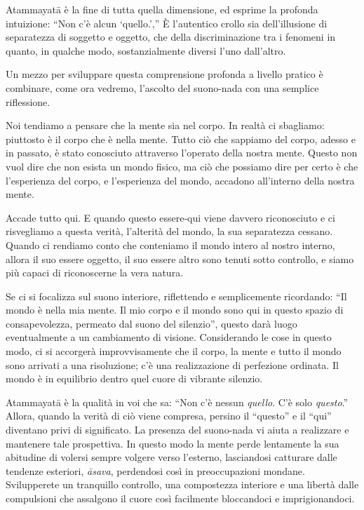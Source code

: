 Atammayatā è la fine di tutta quella dimensione, ed esprime la profonda
intuizione: ``Non c'è alcun `quello.'\thinspace ,'' È l'autentico crollo sia
dell'illusione di separatezza di soggetto e oggetto, che della
discriminazione tra i fenomeni in quanto, in qualche modo,
sostanzialmente diversi l'uno dall'altro.

Un mezzo per sviluppare questa comprensione profonda a livello pratico è
combinare, come ora vedremo, l'ascolto del suono-nada con una semplice
riflessione.

Noi tendiamo a pensare che la mente sia nel corpo. In realtà ci
sbagliamo: piuttosto è il corpo che è nella mente. Tutto ciò che
sappiamo del corpo, adesso e in passato, è stato conosciuto attraverso
l'operato della nostra mente. Questo non vuol dire che non esista un
mondo fisico, ma ciò che possiamo dire per certo è che l'esperienza del
corpo, e l'esperienza del mondo, accadono all'interno della nostra
mente.

Accade tutto qui. E quando questo essere-qui viene davvero riconosciuto
e ci risvegliamo a questa verità, l'alterità del mondo, la sua
separatezza cessano. Quando ci rendiamo conto che conteniamo il mondo
intero al nostro interno, allora il suo essere oggetto, il suo essere
altro sono tenuti sotto controllo, e siamo più capaci di riconoscerne la
vera natura.

Se ci si focalizza sul suono interiore, riflettendo e semplicemente
ricordando: ``Il mondo è nella mia mente. Il mio corpo e il mondo sono
qui in questo spazio di consapevolezza, permeato dal suono del
silenzio'', questo darà luogo eventualmente a un cambiamento di visione.
Considerando le cose in questo modo, ci si accorgerà improvvisamente che
il corpo, la mente e tutto il mondo sono arrivati a una risoluzione; c'è
una realizzazione di perfezione ordinata. Il mondo è in equilibrio
dentro quel cuore di vibrante silenzio.

Atammayatā è la qualità in voi che sa: ``Non c'è nessun \emph{quello}.
C'è solo \emph{questo}.'' Allora, quando la verità di ciò viene
compresa, persino il ``questo'' e il ``qui'' diventano privi di
significato. La presenza del suono-nada vi aiuta a realizzare e
mantenere tale prospettiva. In questo modo la mente perde lentamente la
sua abitudine di volersi sempre volgere verso l'esterno, lasciandosi
catturare dalle tendenze esteriori, \emph{āsava}, perdendosi così in
preoccupazioni mondane. Svilupperete un tranquillo controllo, una
compostezza interiore e una libertà dalle compulsioni che assalgono il
cuore così facilmente bloccandoci e imprigionandoci.

